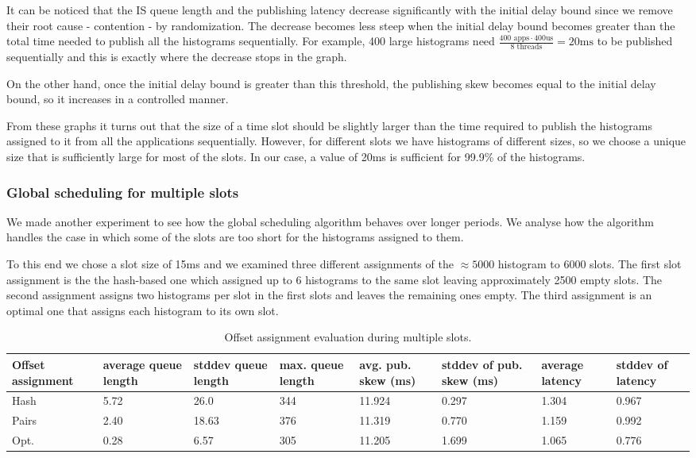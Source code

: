 It can be noticed that the IS queue length and the publishing latency decrease significantly with the initial delay bound since we remove their root cause - contention - by randomization. The decrease becomes less steep when the initial delay bound becomes greater than the total time needed to publish all the histograms sequentially. For example, 400 large histograms need $\frac {400 \text{ apps}\cdot 400 \text{us}} {8 \text{ threads}} = 20\text{ms}$ to be published sequentially and this is exactly where the decrease stops in the graph.

On the other hand, once the initial delay bound is greater than this threshold, the publishing skew becomes equal to the initial delay bound, so it increases in a controlled manner.

From these graphs it turns out that the size of a time slot should be slightly larger than the time required to publish the histograms assigned to it from all the applications sequentially. However, for different slots we have histograms of different sizes, so we choose a unique size that is sufficiently large for most of the slots. In our case, a value of 20ms is sufficient for 99.9\% of the histograms.

\subsubsection*{Global scheduling for multiple slots}

We made another experiment to see how the global scheduling algorithm behaves over longer periods. We analyse how the algorithm handles the case in which some of the slots are too short for the histograms assigned to them.

To this end we chose a slot size of 15ms and we examined three different assignments of the $\approx 5000$ histogram to $6000$ slots. The first slot assignment is the the hash-based one which assigned up to 6 histograms to the same slot leaving approximately 2500 empty slots. The second assignment assigns two histograms per slot in the first slots and leaves the remaining ones empty. The third assignment is an optimal one that assigns each histogram to its own slot. 


\begin{table}
\begin{tabulary}{\textwidth}{|L|L|L|L|L|L|L|L|}
\hline 
Offset assignment & average queue length & stddev queue length & max. queue length & avg. pub. skew (ms) & stddev of pub. skew (ms) & average latency & stddev of latency \\
\hline 
 Hash  & 5.72 & 26.0 & 344 & 11.924 & 0.297 & 1.304 & 0.967 \\
\hline
 Pairs & 2.40 & 18.63 & 376 & 11.319 & 0.770 & 1.159 & 0.992 \\
\hline
 Opt.  & 0.28 & 6.57 & 305 & 11.205 &1.699 &1.065 &0.776\\
\hline 
\end{tabulary}
\caption{Offset assignment evaluation during multiple slots.}
\label{tab:multi_slot_sim}
\end{table}

